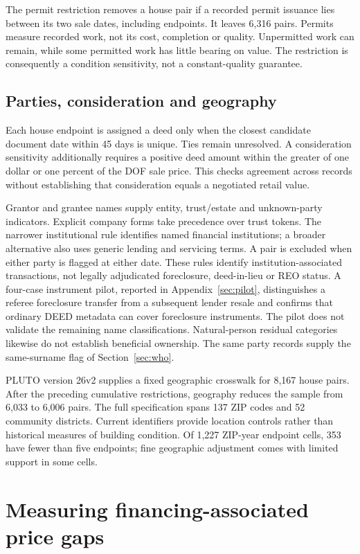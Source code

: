 \documentclass[12pt]{article}
\begin{document}
The permit restriction removes a house pair if a recorded permit issuance lies between its two sale dates, including endpoints. It leaves 6,316 pairs. Permits measure recorded work, not its cost, completion or quality. Unpermitted work can remain, while some permitted work has little bearing on value. The restriction is consequently a condition sensitivity, not a constant-quality guarantee.

\subsection{Parties, consideration and geography}
Each house endpoint is assigned a deed only when the closest candidate document date within 45 days is unique. Ties remain unresolved. A consideration sensitivity additionally requires a positive deed amount within the greater of one dollar or one percent of the DOF sale price. This checks agreement across records without establishing that consideration equals a negotiated retail value.

Grantor and grantee names supply entity, trust/estate and unknown-party indicators. Explicit company forms take precedence over trust tokens. The narrower institutional rule identifies named financial institutions; a broader alternative also uses generic lending and servicing terms. A pair is excluded when either party is flagged at either date. These rules identify institution-associated transactions, not legally adjudicated foreclosure, deed-in-lieu or REO status. A four-case instrument pilot, reported in Appendix~\ref{sec:pilot}, distinguishes a referee foreclosure transfer from a subsequent lender resale and confirms that ordinary DEED metadata can cover foreclosure instruments. The pilot does not validate the remaining name classifications. Natural-person residual categories likewise do not establish beneficial ownership. The same party records supply the same-surname flag of Section~\ref{sec:who}.

PLUTO version 26v2 supplies a fixed geographic crosswalk for 8,167 house pairs. After the preceding cumulative restrictions, geography reduces the sample from 6,033 to 6,006 pairs. The full specification spans 137 ZIP codes and 52 community districts. Current identifiers provide location controls rather than historical measures of building condition. Of 1,227 ZIP-year endpoint cells, 353 have fewer than five endpoints; fine geographic adjustment comes with limited support in some cells.

\section{Measuring financing-associated price gaps}
\end{document}
